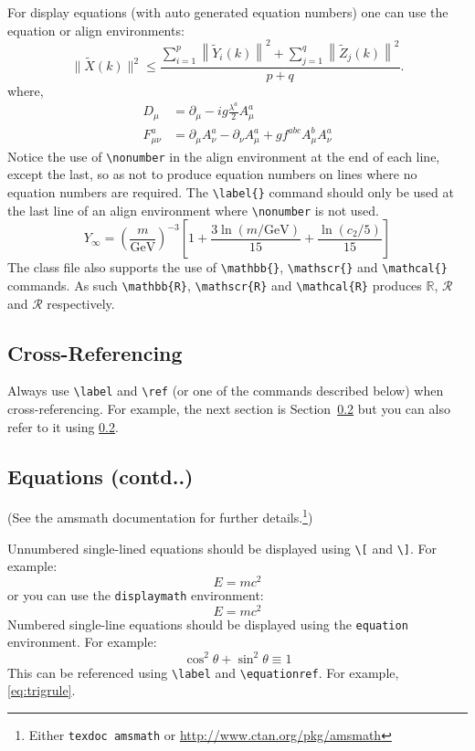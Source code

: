 \documentclass{article}
\begin{document}
For display equations (with auto generated equation numbers)
one can use the equation or align environments:
\begin{equation}
\|\tilde{X}(k)\|^2 \leq\frac{\sum\limits_{i=1}^{p}\left\|\tilde{Y}_i(k)\right\|^2+\sum\limits_{j=1}^{q}\left\|\tilde{Z}_j(k)\right\|^2 }{p+q}.\label{eq1}
\end{equation}
where,
\begin{align}
D_\mu &=  \partial_\mu - ig \frac{\lambda^a}{2} A^a_\mu \nonumber \\
F^a_{\mu\nu} &= \partial_\mu A^a_\nu - \partial_\nu A^a_\mu + g f^{abc} A^b_\mu A^a_\nu \label{eq2}
\end{align}
Notice the use of \verb+\nonumber+ in the align environment at the end
of each line, except the last, so as not to produce equation numbers on
lines where no equation numbers are required. The \verb+\label{}+ command
should only be used at the last line of an align environment where
\verb+\nonumber+ is not used.
\begin{equation}
Y_\infty = \left( \frac{m}{\textrm{GeV}} \right)^{-3}
    \left[ 1 + \frac{3 \ln(m/\textrm{GeV})}{15}
    + \frac{\ln(c_2/5)}{15} \right]
\end{equation}
The class file also supports the use of \verb+\mathbb{}+, \verb+\mathscr{}+ and
\verb+\mathcal{}+ commands. As such \verb+\mathbb{R}+, \verb+\mathscr{R}+
and \verb+\mathcal{R}+ produces $\mathbb{R}$, $\mathscr{R}$ and $\mathcal{R}$ respectively.

\subsection{Cross-Referencing}

Always use \verb|\label| and \verb|\ref| (or one of the commands
described below) when cross-referencing.  For example, the next
section is Section~\ref{sec:math} but you can also refer to it using
\ref{sec:math}.  
 
\subsection{Equations (contd..)}
\label{sec:math}

(See the \textsf{amsmath} documentation for further
details.\footnote{Either \texttt{texdoc amsmath} or
\url{http://www.ctan.org/pkg/amsmath}})

Unnumbered single-lined equations should be displayed using
\verb|\[| and \verb|\]|. For example:
\[E = m c^2\]
or you can use the \texttt{displaymath} environment:
\begin{displaymath}
E = m c^2
\end{displaymath}
Numbered single-line equations should be displayed using the
\texttt{equation} environment. For example:
\begin{equation}\label{eq:trigrule}
\cos^2\theta + \sin^2\theta \equiv 1
\end{equation}
This can be referenced using \verb|\label| and \verb|\equationref|.
For example, \ref{eq:trigrule}.
\end{document}
